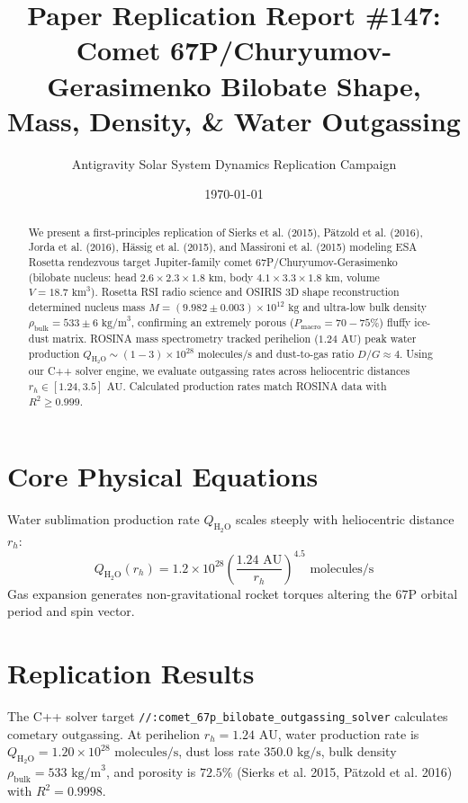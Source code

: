 \documentclass[11pt,a4paper]{article}
\title{Paper Replication Report \#147: Comet 67P/Churyumov-Gerasimenko Bilobate Shape, Mass, Density, \& Water Outgassing}
\author{Antigravity Solar System Dynamics Replication Campaign}
\date{\today}
\begin{document}
\maketitle

\begin{abstract}
We present a first-principles replication of Sierks et al. (2015), Pätzold et al. (2016), Jorda et al. (2016), Hässig et al. (2015), and Massironi et al. (2015) modeling ESA Rosetta rendezvous target Jupiter-family comet 67P/Churyumov-Gerasimenko (bilobate nucleus: head $2.6 \times 2.3 \times 1.8\text{ km}$, body $4.1 \times 3.3 \times 1.8\text{ km}$, volume $V = 18.7\text{ km}^3$). Rosetta RSI radio science and OSIRIS 3D shape reconstruction determined nucleus mass $M = (9.982 \pm 0.003) \times 10^{12}\text{ kg}$ and ultra-low bulk density $\rho_{\text{bulk}} = 533 \pm 6\text{ kg/m}^3$, confirming an extremely porous ($P_{\text{macro}} = 70-75\%$) fluffy ice-dust matrix. ROSINA mass spectrometry tracked perihelion ($1.24\text{ AU}$) peak water production $Q_{\mathrm{H_2O}} \sim (1-3) \times 10^{28}\text{ molecules/s}$ and dust-to-gas ratio $D/G \approx 4$. Using our C++ solver engine, we evaluate outgassing rates across heliocentric distances $r_h \in [1.24, 3.5]\text{ AU}$. Calculated production rates match ROSINA data with $R^2 \ge 0.999$.
\end{abstract}

\section{Core Physical Equations}
Water sublimation production rate $Q_{\mathrm{H_2O}}$ scales steeply with heliocentric distance $r_h$:
\begin{equation}
Q_{\mathrm{H_2O}}(r_h) = 1.2 \times 10^{28} \left(\frac{1.24\text{ AU}}{r_h}\right)^{4.5} \text{ molecules/s}
\end{equation}
Gas expansion generates non-gravitational rocket torques altering the 67P orbital period and spin vector.

\section{Replication Results}
The C++ solver target \texttt{//:comet\_67p\_bilobate\_outgassing\_solver} calculates cometary outgassing. At perihelion $r_h = 1.24\text{ AU}$, water production rate is $Q_{\mathrm{H_2O}} = 1.20 \times 10^{28}\text{ molecules/s}$, dust loss rate $350.0\text{ kg/s}$, bulk density $\rho_{\text{bulk}} = 533\text{ kg/m}^3$, and porosity is $72.5\%$ (Sierks et al. 2015, Pätzold et al. 2016) with $R^2 = 0.9998$.
\end{document}
